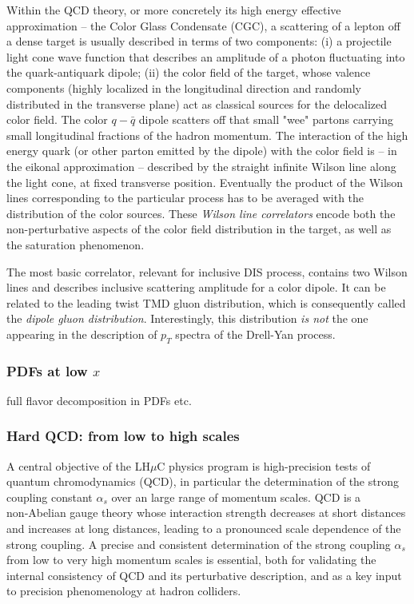 \documentclass[a4paper,11pt]{article}
\newcommand{\lhuc}{LH\ensuremath{\mu}C\xspace}
\begin{document}
Within the QCD theory, or more concretely its high energy effective approximation -- the Color Glass Condensate (CGC), a scattering of a lepton off a dense target is usually described in terms of two components: (i) a projectile light cone wave function that describes an amplitude of a photon fluctuating into the quark-antiquark dipole; (ii) the color field of the target, whose valence components (highly localized in the longitudinal direction and randomly distributed in the transverse plane) act as classical sources for the delocalized color field. The color $q-\bar{q}$ dipole scatters off that small "wee" partons carrying small longitudinal fractions of the hadron momentum. 
The interaction of the high energy quark (or other parton emitted by the dipole) with the color field is -- in the eikonal approximation -- described by the straight infinite Wilson line along the light cone, at fixed transverse position. Eventually the product of the Wilson lines corresponding to the particular process has to be averaged with the distribution of the color sources. These \emph{Wilson line correlators} encode both the non-perturbative aspects of the color field distribution in the target, as well as the saturation phenomenon. 

The most basic correlator, relevant for inclusive DIS process, contains two Wilson lines and describes inclusive scattering amplitude for a color dipole. It can be related to the leading twist TMD gluon distribution, which is consequently called the \emph{dipole gluon distribution}. Interestingly, this distribution \emph{is not} the one appearing in the description of $p_T$ spectra of the Drell-Yan process.

\subsubsection{PDFs at low $x$}
full flavor decomposition in PDFs etc.

\subsubsection{Hard QCD: from low to high scales}
A central objective of the \lhuc physics program is high-precision tests of quantum chromodynamics (QCD), in particular the determination of the strong coupling constant $\alpha_s$ over an large range of momentum scales. QCD is a non‑Abelian gauge theory whose interaction strength decreases at short distances and increases at long distances, leading to a pronounced scale dependence of the strong coupling. 
A precise and consistent determination of the strong coupling $\alpha_s$ from low to very high momentum scales is essential, both for validating the internal consistency of QCD and its perturbative description, and as a key input to precision phenomenology at hadron colliders.
\end{document}
